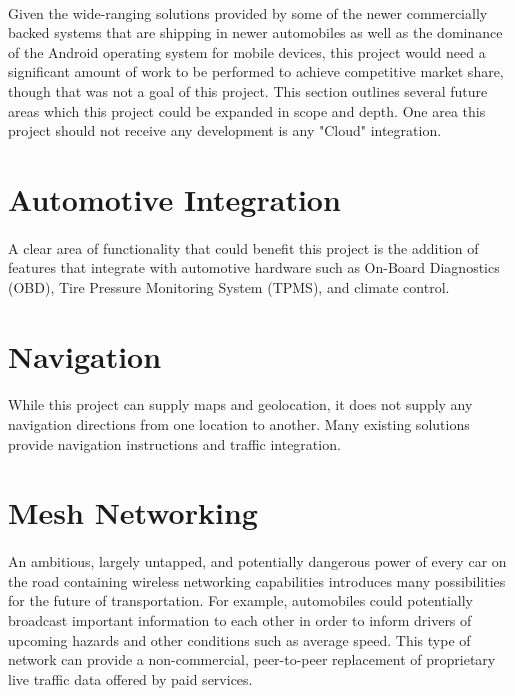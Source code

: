 \paragraph{}
Given the wide-ranging solutions provided by some of the newer commercially backed systems that are shipping in newer automobiles as well as the dominance of the Android operating system for mobile devices, this project would need a significant amount of work to be performed to achieve competitive market share, though that was not a goal of this project.
This section outlines several future areas which this project could be expanded in scope and depth.
One area this project should not receive any development is any "Cloud" integration.

\section{Automotive Integration}

\paragraph{}
A clear area of functionality that could benefit this project is the addition of features that integrate with automotive hardware such as On-Board Diagnostics (OBD), Tire Pressure Monitoring System (TPMS), and climate control.

\section{Navigation}

\paragraph{}
While this project can supply maps and geolocation, it does not supply any navigation directions from one location to another.
Many existing solutions provide navigation instructions and traffic integration.

\section{Mesh Networking}

\paragraph{}
An ambitious, largely untapped, and potentially dangerous power of every car on the road containing wireless networking capabilities introduces many possibilities for the future of transportation.
For example, automobiles could potentially broadcast important information to each other in order to inform drivers of upcoming hazards and other conditions such as average speed.
This type of network can provide a non-commercial, peer-to-peer replacement of proprietary live traffic data offered by paid services.

